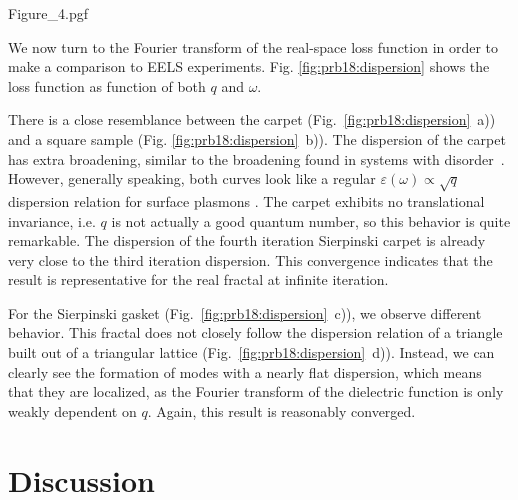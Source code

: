 \begin{figure*}[t]
    \centering
    {Figure_4.pgf}
    \caption{Dispersion relation $\;-\operatorname{Im}[1 / \langle\mathbf{q}| \hat\varepsilon(\omega) |\mathbf{q}\rangle]$, showing the frequency and momentum dependency of the loss function. Momentum was taken along the $x$--axis. a) A square built out of square lattice as compared to b) the fourth iteration Sierpinski carpet. Similarly, c) a triangle built out of triangular lattice as compared to d) a sixth iteration Sierpinski gasket. The maximum of the left hand side is plotted as a dashed white line on the right hand side.}
    \label{fig:prb18:dispersion}
\end{figure*}

We now turn to the Fourier transform of the real-space loss function in order to make a comparison to EELS experiments. Fig. \ref{fig:prb18:dispersion} shows the loss function as function of both $q$ and $\omega$.

There is a close resemblance between the carpet (Fig.~\ref{fig:prb18:dispersion}~a)) and a square sample (Fig. \ref{fig:prb18:dispersion}~b)). The dispersion of the carpet has extra broadening, similar to the broadening found in systems with disorder~\cite{jin_screening_2015}. However, generally speaking, both curves look like a regular $\varepsilon(\omega) \propto \sqrt{q}$ dispersion relation for surface plasmons \cite{giuliani2005quantum}. The carpet exhibits no translational invariance, i.e. $q$ is not actually a good quantum number, so this behavior is quite remarkable. The dispersion of the fourth iteration Sierpinski carpet is already very close to the third iteration dispersion. This convergence indicates that the result is representative for the real fractal at infinite iteration.

For the Sierpinski gasket (Fig.~\ref{fig:prb18:dispersion}~c)), we observe different behavior. This fractal does not closely follow the dispersion relation of a triangle built out of a triangular lattice (Fig.~\ref{fig:prb18:dispersion}~d)).  Instead, we can clearly see the formation of modes with a nearly flat dispersion, which means that they are localized, as the Fourier transform of the dielectric function is only weakly dependent on $q$. Again, this result is reasonably converged.

\section{Discussion}

